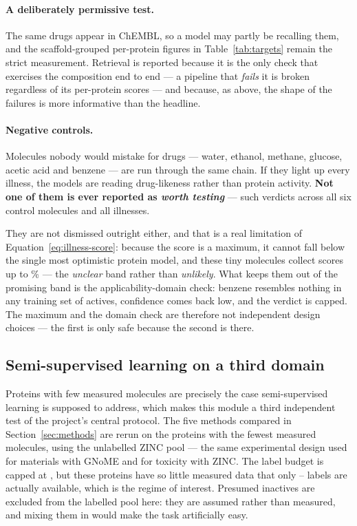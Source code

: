 \paragraph{A deliberately permissive test.} The same drugs appear in ChEMBL, so a model may partly
be recalling them, and the scaffold-grouped per-protein figures in Table~\ref{tab:targets} remain
the strict measurement. Retrieval is reported because it is the only check that exercises the
composition end to end --- a pipeline that \emph{fails} it is broken regardless of its per-protein
scores --- and because, as above, the shape of the failures is more informative than the headline.

\paragraph{Negative controls.} Molecules nobody would mistake for drugs --- water, ethanol,
methane, glucose, acetic acid and benzene --- are run through the same chain. If they light up
every illness, the models are reading drug-likeness rather than protein activity. \textbf{Not one
of them is ever reported as \emph{worth testing}} --- \TgtCtrlFlags{} such verdicts across all six
control molecules and all \TgtNDiseases{} illnesses.

They are not dismissed outright either, and that is a real limitation of
Equation~\ref{eq:illness-score}: because the score is a maximum, it cannot fall below the single
most optimistic protein model, and these tiny molecules collect scores up to \TgtCtrlMax\% --- the
\emph{unclear} band rather than \emph{unlikely}. What keeps them out of the promising band is the
applicability-domain check: benzene resembles nothing in any training set of actives, confidence
comes back low, and the verdict is capped. The maximum and the domain check are therefore not
independent design choices --- the first is only safe because the second is there.

\subsection{Semi-supervised learning on a third domain}

Proteins with few measured molecules are precisely the case semi-supervised learning is supposed
to address, which makes this module a third independent test of the project's central protocol.
The five methods compared in Section~\ref{sec:methods} are rerun on the \TgtSSLNTargets{} proteins
with the fewest measured molecules, using the unlabelled ZINC pool --- the same experimental
design used for materials with GNoME and for toxicity with ZINC. The label budget is capped at
\TgtSSLBudget{}, but these proteins have so little measured data that only
\TgtSSLLabelsMin{}--\TgtSSLLabelsMax{} labels are actually available, which is the regime of
interest. Presumed inactives are excluded from the labelled pool here: they are assumed rather
than measured, and mixing them in would make the task artificially easy.

